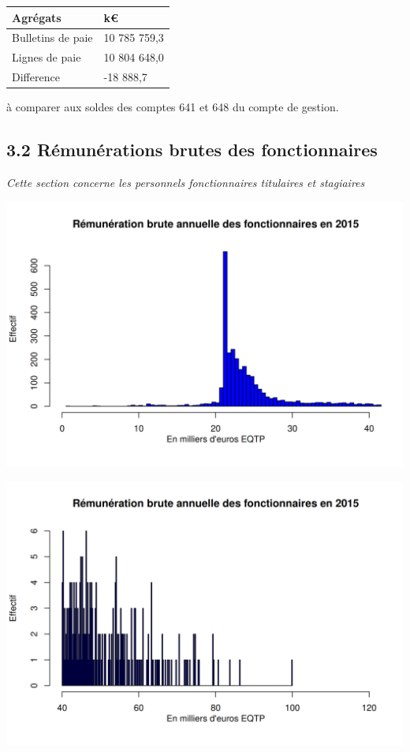 \begin{longtable}[]{@{}ll@{}}
\toprule
Agrégats & k€\tabularnewline
\midrule
\endhead
Bulletins de paie & 10 785 759,3\tabularnewline
Lignes de paie & 10 804 648,0\tabularnewline
Difference & -18 888,7\tabularnewline
\bottomrule
\end{longtable}

à comparer aux soldes des comptes 641 et 648 du compte de gestion.

\hypertarget{remunerations-brutes-des-fonctionnaires-1}{%
\subsection{3.2 Rémunérations brutes des
fonctionnaires}\label{remunerations-brutes-des-fonctionnaires-1}}

\emph{Cette section concerne les personnels fonctionnaires titulaires et
stagiaires}

\includegraphics{altair_files/figure-latex/unnamed-chunk-76-1.png}

\includegraphics{altair_files/figure-latex/unnamed-chunk-76-2.png}

